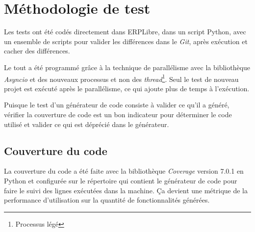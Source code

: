 \section{Méthodologie de test}
Les tests ont été codés directement dans ERPLibre, dans un script Python, avec un ensemble de scripts pour valider les différences dans le \textit{Git}, après exécution et cacher des différences.

Le tout a été programmé grâce à la technique de parallélisme avec la bibliothèque \textit{Asyncio} et des nouveaux processus et non des \textit{thread}\footnote{Processus légé}. Seul le test de nouveau projet est exécuté après le parallélisme, ce qui ajoute plus de temps à l’exécution.

Puisque le test d’un générateur de code consiste à valider ce qu’il a généré, vérifier la couverture de code est un bon indicateur pour déterminer le code utilisé et valider ce qui est déprécié dans le générateur.

\subsection{Couverture du code}
La couverture du code a été faite avec la bibliothèque \textit{Coverage} version 7.0.1 en Python et configurée sur le répertoire qui contient le générateur de code pour faire le suivi des lignes exécutées dans la machine. Ça devient une métrique de la performance d’utilisation sur la quantité de fonctionnalités générées.

